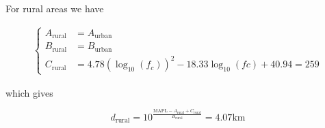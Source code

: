 \documentclass[]{article}
\begin{document}
	For rural areas we have
	
	\begin{align}
		\begin{cases}
			A_{\text{rural}} &= A_{\text{urban}} \\
			B_{\text{rural}} &= B_{\text{urban}} \\
			C_{\text{rural}} &= 4.78(\log_{10}(f_c))^2 - 18.33\log_{10}(fc) + 40.94 = 259
		\end{cases}
	\end{align}
	
	which gives
	
	\begin{equation}
		d_{\text{rural}} = 10^{\frac{\text{MAPL} - A_{\text{rural}} + C_{\text{rural}}}{B_{\text{rural}}}} = 4.07\text{km}
	\end{equation}
\end{document}

